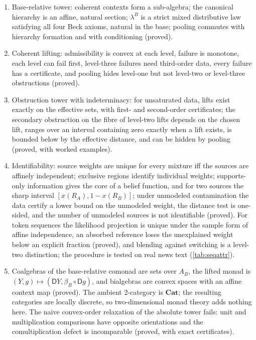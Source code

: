 \documentclass[11pt]{article}
\theoremstyle{definition}
\theoremstyle{remark}
\newcommand{\D}{\mathsf{D}}
\begin{document}
\begin{enumerate}[leftmargin=*]
\item Base-relative tower: coherent contexts form a sub-algebra; the canonical hierarchy is an
  affine, natural section; $\lambda^B$ is a strict mixed distributive law satisfying all four Beck
  axioms, natural in the base; pooling commutes with hierarchy formation and with conditioning
  (proved).
\item Coherent lifting: admissibility is convex at each level, failure is monotone, each level can
  fail first, level-three failures need third-order data, every failure has a certificate, and pooling
  hides level-one but not level-two or level-three obstructions (proved).
\item Obstruction tower with indeterminacy: for unsaturated data, lifts exist exactly on the effective
  sets, with first- and second-order certificates; the secondary obstruction on the fibre of level-two
  lifts depends on the chosen lift, ranges over an interval containing zero exactly when a lift exists,
  is bounded below by the effective distance, and can be hidden by pooling (proved, with worked
  examples).
\item Identifiability: source weights are unique for every mixture iff the sources are affinely
  independent; exclusive regions identify individual weights; supports-only information gives the
  core of a belief function, and for two sources the sharp interval $[x(R_A),1-x(R_B)]$; under
  unmodeled contamination the data certify a lower bound on the unmodeled weight, the distance test
  is one-sided, and the number of unmodeled sources is not identifiable (proved). For token sequences the likelihood projection is unique under the sample form of affine independence, an absorbed reference loses the unexplained weight below an explicit fraction (proved), and blending against switching is a level-two distinction; the procedure is tested on real news text (\cref{tab:seqattr}).
\item Coalgebras of the base-relative comonad are sets over $A_B$, the lifted monad is
  $(Y,g)\mapsto(\D Y,\beta_B\circ\D g)$, and bialgebras are convex spaces with an affine context map
  (proved). The ambient 2-category is $\mathbf{Cat}$; the resulting categories are locally discrete,
  so two-dimensional monad theory adds nothing here. The naive convex-order relaxation of the
  absolute tower fails: unit and multiplication comparisons have opposite orientations and the
  comultiplication defect is incomparable (proved, with exact certificates).

\end{enumerate}
\end{document}
